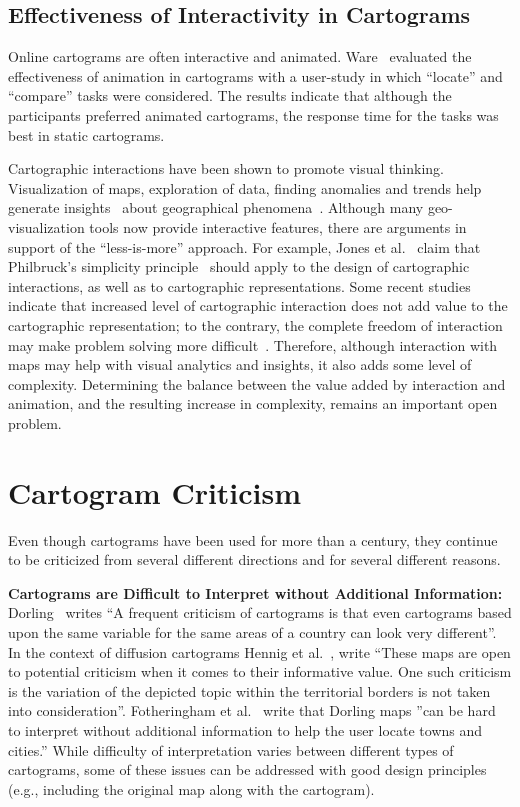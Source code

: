 \documentclass{egpubl}
\begin{document}
\subsection{Effectiveness of Interactivity in Cartograms}

Online cartograms are often interactive and animated. 
Ware~\cite{Jen} evaluated the effectiveness of animation in cartograms with a user-study in which ``locate'' and ``compare'' tasks were considered. The results indicate that although the participants preferred animated cartograms, the response time for the tasks was best in static cartograms. 

Cartographic interactions have been shown to promote visual thinking. Visualization of maps, exploration of data, finding anomalies and trends help generate insights~\cite{SARAIYA, NORTH06} about geographical phenomena~\cite{Roth}. Although many geo-visualization tools now provide interactive features, there are arguments in support of the ``less-is-more'' approach. For example, Jones et al.~\cite{Jones} claim that Philbruck's simplicity principle~\cite{Phil} should apply to the design of cartographic interactions, as well as to cartographic representations. Some recent studies indicate that increased level of cartographic interaction does not add value to the cartographic representation; to the contrary, the complete freedom of interaction may make  problem solving more difficult~\cite{DOU, Jones}. Therefore, although interaction with maps may help with visual analytics and insights, it also adds some level of complexity. Determining the balance between the value added by interaction and animation, and the resulting increase in complexity, remains an important open problem.




\section{Cartogram Criticism}


Even though cartograms have been used for more than a century, they continue to be criticized from several different directions and for several different reasons.



\noindent
\textbf{Cartograms are Difficult to Interpret without Additional Information:}
Dorling~\cite{dorling96} writes ``A frequent criticism of cartograms is that even cartograms based upon the same variable for the same areas of a country can look very different''. In the context of diffusion cartograms  Hennig et al.~\cite{hennig2009re}, write ``These maps are open to potential criticism when it comes to their informative value. One such criticism is the variation of the depicted topic within the territorial borders is not taken into consideration''.
Fotheringham et al.~\cite{Fother} write that Dorling maps ''can be hard to interpret without additional information to help the user locate towns and cities.'' 
While difficulty of interpretation varies between different types of cartograms, some of these issues can be addressed with good design principles (e.g., including the original map along with the cartogram).
\end{document}
